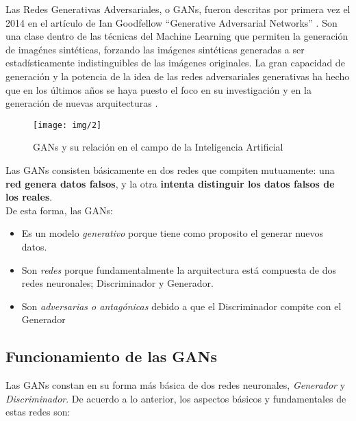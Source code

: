 Las Redes Generativas Adversariales, o GANs, fueron descritas por primera vez el 2014 en el artículo de Ian Goodfellow
``Generative Adversarial Networks'' \cite{goodfellowGenerativeAdversarialNetworks2014}. Son una clase dentro de las técnicas
del Machine Learning que permiten la generación de imagénes sintéticas, forzando las imágenes sintéticas generadas a ser
estadísticamente indistinguibles de las imágenes originales. La gran capacidad de generación y la potencia de la idea de las redes
adversariales generativas ha hecho que en los últimos años se haya puesto el foco en su investigación y en la generación de nuevas
arquitecturas \cite{panRecentProgressGenerative2019}\cite{wangGenerativeAdversarialNetworks2019} \cite{gujarGenerativeAdversarialNetworks2019}.\\

\begin{figure}[H]
    \texttt{[image: img/2]}
    \centering
    \caption{GANs y su relación en el campo de la Inteligencia Artificial \cite{langrGANsActionDeep2019}}
    \label{2}
\end{figure}

Las GANs consisten básicamente en dos redes que compiten mutuamente: una \textbf{red genera datos falsos}, y la otra \textbf{intenta
distinguir los datos falsos de los reales}.\\
De esta forma, las GANs:
\begin{itemize}
    \item  Es un modelo \emph{generativo} porque tiene como proposito el generar nuevos datos.
    \item Son \emph{redes}
    porque fundamentalmente la arquitectura está compuesta de dos redes neuronales; Discriminador y Generador.
    \item Son
    \emph{adversarias o antagónicas} debido a que el Discriminador compite con el Generador
\end{itemize}

\clearpage
\subsection{Funcionamiento de las GANs}

Las GANs constan en su forma más básica de dos redes neuronales, \emph{Generador} y \emph{Discriminador}. De acuerdo a lo anterior,
los aspectos básicos y fundamentales de estas redes son:
\vspace{-0.6cm}

